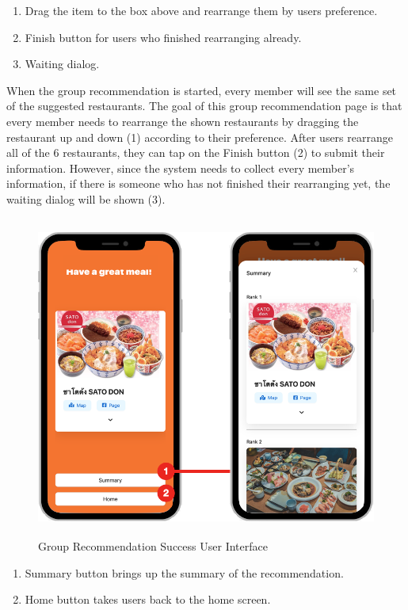 \documentclass[12pt,oneside,openright,a4paper]{cpe-english-project}
\begin{document}
\begin{enumerate}
\item Drag the item to the box above and rearrange them by users preference.
\item Finish button for users who finished rearranging already.
\item Waiting dialog.
\end{enumerate}

When the group recommendation is started, every member will see the same set of the suggested restaurants. The goal of this group recommendation page is that every member needs to rearrange the shown restaurants by dragging the restaurant up and down (1) according to their preference. After users rearrange all of the 6 restaurants, they can tap on the Finish button (2) to submit their information. However, since the system needs to collect every member’s information, if there is someone who has not finished their rearranging yet, the waiting dialog will be shown (3).
\begin{figure}[H]\centering
\includegraphics[height=300pt]{./images/4ui_GroupRecommendationSuccessUserInterface.png}
\caption{Group Recommendation Success User Interface}\label{fig:4ui_GroupRecommendationSuccessUserInterface}
\end{figure}

\begin{enumerate}
\item Summary button brings up the summary of the recommendation.
\item Home button takes users back to the home screen.
\end{enumerate}
\end{document}
